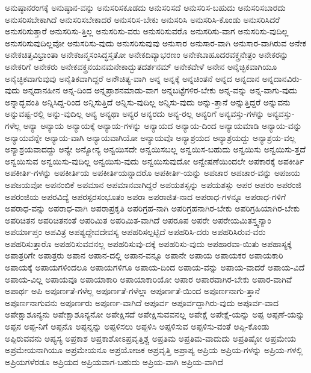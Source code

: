 {ಅನುಷ್ಠಾನರಂಗಕ್ಕೆ
ಅನುಷ್ಠಾನ-ವನ್ನು
ಅನುಸರಿಸಕೂಡದು
ಅನುಸರಿಸದೆ
ಅನುಸರಿಸ-ಬಹುದು
ಅನುಸರಿಸಬಾರದು
ಅನುಸರಿಸಬೇಕಾಗಿದೆ
ಅನುಸರಿಸಬೇಕಾದರೆ
ಅನುಸರಿಸ-ಬೇಕು
ಅನುಸರಿಸಿ
ಅನುಸರಿಸಿ-ಕೊಂಡು
ಅನುಸರಿಸಿದರೆ
ಅನುಸರಿಸುತ್ತಾರೆ
ಅನುಸರಿಸು-ತ್ತಿಲ್ಲ
ಅನುಸರಿಸು-ವರು
ಅನುಸರಿಸುವರೊ
ಅನುಸರಿಸು-ವಾಗ
ಅನುಸರಿಸು-ವುದಿಲ್ಲ
ಅನುಸರಿಸುವುದಿಲ್ಲವೋ
ಅನುಸರಿಸು-ವುದು
ಅನುಸರಿಸುವುವು
ಅನುಸಾರ
ಅನುಸಾರ-ವಾಗಿ
ಅನುಸಾರ-ವಾಗಿರುವ
ಅನೇಕ
ಅನೇಕಚಿತ್ತವಿಭ್ರಾಂತಾ
ಅನೇಕಜನ್ಮಸಂಸಿದ್ಧಸ್ತತೋ
ಅನೇಕದಿವ್ಯಾಭರಣಂ
ಅನೇಕಬಾಹೂದರವಕ್ತ್ರನೇತ್ರಂ
ಅನೇಕರನ್ನು
ಅನೇಕರಿಗೆ
ಅನೇಕರು
ಅನೇಕವಕ್ತ್ರನಯನಮನೇಕಾದ್ಭುತದರ್ಶನಮ್
ಅನೇಕವೇಳೆ
ಅನೇನ
ಅನೈಚ್ಛಿಕವಾಗಿಯೂ
ಅನೈಚ್ಛಿಕವಾಗುವುವು
ಅನೈತಿಕವಾಗಿದ್ದರೆ
ಅನೌಚಿತ್ಯ-ವಾಗಿ
ಅನ್ನ
ಅನ್ನಕ್ಕೆ
ಅನ್ನಚಿಂತನೆ
ಅನ್ನದ
ಅನ್ನದಾನ
ಅನ್ನದಾನವಿರು-ವುದು
ಅನ್ನದಾನಹೀನ
ಅನ್ನ-ದಿಂದ
ಅನ್ನಪ್ರಾಶನಮಾಡು-ವಾಗ
ಅನ್ನಬಟ್ಟೆಗಳಿರ-ಬೇಕು
ಅನ್ನ-ವನ್ನು
ಅನ್ನ-ವಾಗು-ವುದು
ಅನ್ನಾದ್ಭವಂತಿ
ಅನ್ನಿಸಿದ್ದ-ರಿಂದ
ಅನ್ನಿಸುತ್ತಿದೆ
ಅನ್ನಿಸು-ವುದಿಲ್ಲ
ಅನ್ನಿಸು-ವುದು
ಅನ್ನು-ತ್ತಾನೆ
ಅನ್ನುತ್ತಿದ್ದರೆ
ಅನ್ನುವನು
ಅನ್ನುವಷ್ಟ-ರಲ್ಲಿ
ಅನ್ನು-ವುದಿಲ್ಲ
ಅನ್ಯ
ಅನ್ಯಥಾ
ಅನ್ಯರ
ಅನ್ಯರದು
ಅನ್ಯ-ರಲ್ಲ
ಅನ್ಯರಿಗೆ
ಅನ್ಯವಸ್ತು-ಗಳನ್ನು
ಅನ್ಯವಸ್ತು-ಗಳೆಲ್ಲ
ಅನ್ಯಾ
ಅನ್ಯಾಯ
ಅನ್ಯಾಯಕ್ಕೆ
ಅನ್ಯಾಯ-ಗಳನ್ನು
ಅನ್ಯಾಯದ
ಅನ್ಯಾಯ-ದಿಂದ
ಅನ್ಯಾಯಮಾಡಿ
ಅನ್ಯಾಯ-ವನ್ನು
ಅನ್ಯಾಯವನ್ನೇ
ಅನ್ಯಾಯ-ವಾಗಿ
ಅನ್ಯಾಯವಾಗಿಯೋ
ಅನ್ಯಾಯವೊ
ಅನ್ಯಾಶ್ರಯದ
ಅನ್ಯಾಶ್ರಯದ್ದು
ಅನ್ಯಾಶ್ರಯ-ವಲ್ಲ
ಅನ್ಯಾಶ್ರಯವಾದದ್ದು
ಅನ್ಯೇ
ಅನ್ಯೋನ್ಯ
ಅನ್ವಯಿಸದೇ
ಅನ್ವಯಿಸಬಲ್ಲ
ಅನ್ವಯಿಸ-ಬಹುದು
ಅನ್ವಯಿಸು
ಅನ್ವಯಿಸು-ತ್ತದೆ
ಅನ್ವಯಿಸುವ
ಅನ್ವಯಿಸು-ವುದಿಲ್ಲ
ಅನ್ವಯಿಸು-ವುದು
ಅನ್ವಯಿಸುವುದೋ
ಅನ್ವೇಷಣೆಯಿಂದಲೇ
ಅಪಕಾರಕ್ಕೆ
ಅಪಕೀರ್ತಿ
ಅಪಕೀರ್ತಿ-ಗಳನ್ನು
ಅಪಕೀರ್ತಿಯ
ಅಪಕೀರ್ತಿಯನ್ನಾದರೊ
ಅಪಕೀರ್ತಿ-ಯನ್ನು
ಅಪಚಾರ
ಅಪಚಾರ-ವನ್ನು
ಅಪಜಯ
ಅಪಜಯವೋ
ಅಪನಂಬಿಕೆ
ಅಪಮಾನ
ಅಪಮಾನವಾಗಿದ್ದರೆ
ಅಪಯಶಸ್ಸನ್ನು
ಅಪಯಶಸ್ಸು
ಅಪರ
ಅಪರಂ
ಅಪರಂಜಿ
ಅಪರಂಜಿಯ
ಅಪರವಿದ್ಯೆ
ಅಪರಸ್ಪರಸಂಭೂತಂ
ಅಪರಾ
ಅಪರಾಜಿತ-ನಾದ
ಅಪರಾಧ-ಗಳನ್ನೂ
ಅಪರಾಧ-ಗಳಿಗೆ
ಅಪರಾಧ-ವನ್ನು
ಅಪರಾಧ-ವಾಗಿ
ಅಪರಾಪ್ರಕೃತಿ
ಅಪರಿಗ್ರಹ-ನಾಗಿ
ಅಪರಿಗ್ರಹನಾಗಿರ-ಬೇಕು
ಅಪರಿಗ್ರಹಿಯಾಗಿರ-ಬೇಕು
ಅಪರಿಚಿತನ
ಅಪರಿಚಿತನಂತೆ
ಅಪರಿಮಿತ
ಅಪರಿಮಿತ-ವಾಗಿದೆ
ಅಪರೂಪ
ಅಪರೇ
ಅಪರೇಯಮಿತಸ್ತ್ವನ್ಯಾಂ
ಅಪರ್ಯಾಪ್ತಂ
ಅಪವಿತ್ರ
ಅಪಶ್ಯದ್ದೇವದೇವಸ್ಯ
ಅಪಹರಿಸಲ್ಪಟ್ಟಿದೆ
ಅಪಹರಿಸಿ-ದರು
ಅಪಹರಿಸಿರುವ-ವರು
ಅಪಹರಿಸುತ್ತಾರೊ
ಅಪಹರಿಸುವವನಲ್ಲ
ಅಪಹರಿಸುವು-ದಕ್ಕೆ
ಅಪಹರಿಸು-ವುದು
ಅಪಹಾರವಾ-ಯಿತು
ಅಪಹಾಸ್ಯಕ್ಕೆ
ಅಪಾತ್ರರಿಗೇ
ಅಪಾತ್ರರು
ಅಪಾನ
ಅಪಾನ-ದಲ್ಲಿ
ಅಪಾನ-ವನ್ನೂ
ಅಪಾನೇ
ಅಪಾಯ
ಅಪಾಯಕರ
ಅಪಾಯಕಾರಿ
ಅಪಾಯಕ್ಕೆ
ಅಪಾಯಗಳಿಂದಲೂ
ಅಪಾಯಗಳಿಗೂ
ಅಪಾಯ-ದಿಂದ
ಅಪಾಯ-ವನ್ನು
ಅಪಾಯ-ವಾದರೆ
ಅಪಾಯ-ವಿದೆ
ಅಪಾಯ-ವಿಲ್ಲ
ಅಪಾಯವೂ
ಅಪಾಯಾಕಾರಿ
ಅಪಾಯಾಕಾರಿಯೋ
ಅಪಾರ
ಅಪಾರವಾಗಿರ-ಬೇಕು
ಅಪಾರ-ವಾಗಿವೆ
ಅಪಾರ್ಥ
ಅಪಿ
ಅಪೂರ್ಣತೆ-ಗಳೆಲ್ಲ
ಅಪೂರ್ಣತೆ-ಗಳೆಲ್ಲಾ
ಅಪೂರ್ಣತೆ-ಯಿಂದ
ಅಪೂರ್ಣನಾಗು-ತ್ತಾನೆ
ಅಪೂರ್ಣನಾಗುವನು
ಅಪೂರ್ಣರು
ಅಪೂರ್ಣ-ವಾಗಿದೆ
ಅಪೂರ್ವ
ಅಪೂರ್ವದ್ದಾಗಿರು-ವುದು
ಅಪೂರ್ವ-ವಾದ
ಅಪೇಕ್ಷಾಶೂನ್ಯನು
ಅಪೇಕ್ಷಾಶೂನ್ಯನೋ
ಅಪೇಕ್ಷಿಸದೆ
ಅಪೇಕ್ಷಿಸುವವನಲ್ಲ
ಅಪೇಕ್ಷೆ
ಅಪೇಕ್ಷೆ-ಯನ್ನು
ಅಪ್ಪ
ಅಪ್ಪಣೆ-ಯನ್ನು
ಅಪ್ಪನ
ಅಪ್ಪ-ನಿಗೆ
ಅಪ್ಪನೊ
ಅಪ್ಪನ್ನನ್ನು
ಅಪ್ಪಳಿಸಲು
ಅಪ್ಪಳಿಸಿ
ಅಪ್ಪಳಿಸುವ
ಅಪ್ಪಳಿಸು-ವಂತೆ
ಅಪ್ಪಿ-ಕೊಂಡು
ಅಪ್ಪಿರುವವನು
ಅಪ್ಯಸ್ಯ
ಅಪ್ರಕಾಶ
ಅಪ್ರಕಾಶೋಽಪ್ರವೃತ್ತಿಶ್ಚ
ಅಪ್ರತಿಮ
ಅಪ್ರತಿಮ-ವಾದುದು
ಅಪ್ರತಿಷ್ಠೋ
ಅಪ್ರಮೇಯ
ಅಪ್ರಮೇಯನಾಗಿಯೂ
ಅಪ್ರಮೇಯನೂ
ಅಪ್ರಯೋಜಕ
ಅಪ್ರವೃತ್ತಿ
ಅಪ್ರಾಪ್ಯ
ಅಪ್ರಿಯ
ಅಪ್ರಿಯ-ಗಳನ್ನು
ಅಪ್ರಿಯ-ಗಳಲ್ಲಿ
ಅಪ್ರಿಯಗಳೆರಡೂ
ಅಪ್ರಿಯದ
ಅಪ್ರಿಯವಾಗ-ಬಹುದು
ಅಪ್ರಿಯ-ವಾಗಿ
ಅಪ್ರಿಯ-ವಾಗಿದೆ
}
